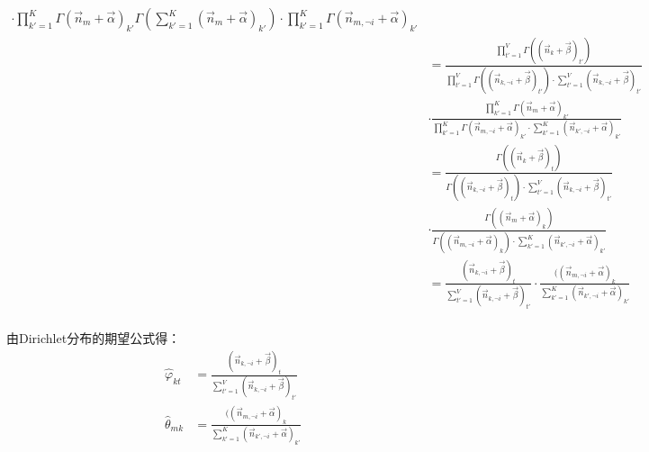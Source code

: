 \begin{displaymath}
\begin{split}
{       \cdot
        \prod_{k'=1}^{K}{ \Gamma(\vec{n}_{m}+\vec{\alpha})_{k'} }
}{     \Gamma(\sum_{k'=1}^{K}{(\vec{n}_{m}+\vec{\alpha})_{k'}})
        \cdot
       \prod_{k'=1}^{K}{ \Gamma(\vec{n}_{m, \neg i}+\vec{\alpha})_{k'} }
}\\
&= \frac{\prod_{t'=1}^{V}{  \Gamma((\vec{n}_{k}+\vec{\beta})_{t'})  }
        }{
       \prod_{t'=1}^{V}{ \Gamma((\vec{n}_{k, \neg i}+\vec{\beta})_{t'}) }
       \cdot
       \sum_{t'=1}^{V}{(\vec{n}_{k, \neg i}+\vec{\beta})_{t'}}
       }\\
&\cdot
\frac{ \prod_{k'=1}^{K}{ \Gamma(\vec{n}_{m}+\vec{\alpha})_{k'}}
}{     \prod_{k'=1}^{K}{ \Gamma(\vec{n}_{m, \neg i}+\vec{\alpha})_{k'}}
        \cdot
        \sum_{k'=1}^{K}{(\vec{n}_{k', \neg i}+\vec{\alpha})_{k'}}
}\\
&= \frac{\Gamma((\vec{n}_{k}+\vec{\beta})_t)
        }{
       \Gamma((\vec{n}_{k, \neg i}+\vec{\beta})_t)
       \cdot
       \sum_{t'=1}^{V}{(\vec{n}_{k, \neg i}+\vec{\beta})_{t'}}
       }\\
&\cdot
\frac{\Gamma((\vec{n}_{m}+\vec{\alpha})_{k})
}{ \Gamma((\vec{n}_{m, \neg i}+\vec{\alpha})_{k})
        \cdot
        \sum_{k'=1}^{K}{(\vec{n}_{k', \neg i}+\vec{\alpha})_{k'}}
}\\
&= \frac{(\vec{n}_{k, \neg i}+\vec{\beta})_t
        }{
       \sum_{t'=1}^{V}{(\vec{n}_{k, \neg i}+\vec{\beta})_{t'}}
       }
\cdot
\frac{((\vec{n}_{m, \neg i}+\vec{\alpha})_{k}
}{\sum_{k'=1}^{K}{(\vec{n}_{k', \neg i}+\vec{\alpha})_{k'}}
}\\
\end{split}
\end{displaymath}

由Dirichlet分布的期望公式得：
\begin{displaymath}
\begin{split}
 \hat{\varphi}_{kt} &= \frac{(\vec{n}_{k, \neg i}+\vec{\beta})_t
        }{
       \sum_{t'=1}^{V}{(\vec{n}_{k, \neg i}+\vec{\beta})_{t'}}
       }
\\
\hat{\theta}_{mk} &= \frac{((\vec{n}_{m, \neg i}+\vec{\alpha})_{k}
}{\sum_{k'=1}^{K}{(\vec{n}_{k', \neg i}+\vec{\alpha})_{k'}}
}
\end{split}
\end{displaymath}

